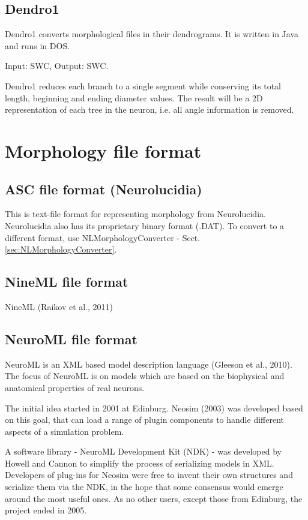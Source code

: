\subsection{Dendro1}
\label{sec:Dendro1}

Dendro1 converts morphological files in their dendrograms.
It is written in Java and runs in DOS. 

Input: SWC, Output: SWC.

Dendro1 reduces each branch to a single segment while conserving its total
length, beginning and ending diameter values. The result will be a 2D
representation of each tree in the neuron, i.e. all angle information is
removed.



\section{Morphology file format}

\subsection{ASC file format (Neurolucidia)}
\label{sec:ASC-file-format}

This is text-file format for representing morphology from Neurolucidia.
Neurolucidia also has its proprietary binary format (.DAT). To convert to a
different format, use NLMorphologyConverter -
Sect.\ref{sec:NLMorphologyConverter}.

\subsection{NineML file format}
\label{sec:NineML-file-format}

NineML (Raikov et al., 2011)

\subsection{NeuroML file format}
\label{sec:NeuroML-file-format}

NeuroML is an XML based model description language (Gleeson et al., 2010).
The focus of NeuroML is on models which are based on the biophysical and
anatomical properties of real neurons.

The initial idea started in 2001 at Edinburg. Neosim (2003)  was developed
based on this goal, that can load a range of plugin components  to handle different aspects of
a simulation problem.

A software library - NeuroML Development Kit (NDK) - was developed by Howell and
Cannon to simplify the process of serializing models in XML.
Developers of plug-ins for Neosim were free to invent their own structures and
serialize them via the NDK, in the hope that some consensus would emerge around
the most useful ones. As no other users, except those from Edinburg, the
project ended in 2005.

